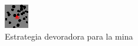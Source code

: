 \begin{figure}
\centering
\includegraphics[width=0.7\linewidth]{./game} %
\caption{Estrategia devoradora para la mina}
\label{fig:defenseValueCellsHead}
\end{figure}
